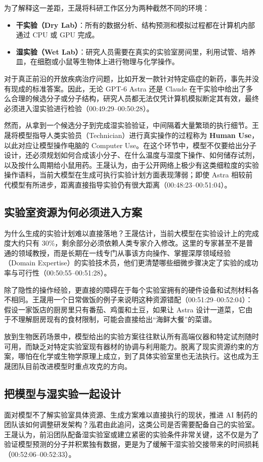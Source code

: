 \documentclass[UTF8,a4paper,11pt,fontset=fandol]{ctexart}
\begin{document}
为了解释这一差距，王晟将科研工作区分为两种截然不同的环境：
\begin{itemize}
\item \textbf{干实验（Dry Lab）}：所有的数据分析、结构预测和模拟过程都在计算机内部通过 CPU 或 GPU 完成。
\item \textbf{湿实验（Wet Lab）}：研究人员需要在真实的实验室房间里，利用试管、培养皿，在细胞或小鼠等生物体上进行物理与化学操作。
\end{itemize}
对于真正前沿的开放疾病治疗问题，比如开发一款针对特定癌症的新药，事先并没有现成的标准答案。因此，无论 GPT-6 Astra 还是 Claude 在干实验中给出了多么合理的候选分子或分子结构，研究人员都无法仅凭计算机模拟断定其有效，最终必须进入湿实验进行检验（00:49:29–00:50:28）。

然而，从拿到一个候选分子到完成湿实验验证，中间隔着大量繁琐的执行细节。王晟将模型指导人类实验员（Technician）进行真实操作的过程称为 \textbf{Human Use}，以此对应让模型操作电脑的 Computer Use。在这个环节中，模型不仅要给出分子设计，还必须规划如何合成该小分子、在什么温度与湿度下操作、如何储存试剂，以及按什么周期给小鼠用药。王晟认为，由于公开网络上极少有这类细粒度的实验操作语料，当前大模型在生成可执行实验计划方面表现薄弱；即使 Astra 相较前代模型有所进步，距离直接指导实验仍有很大距离（00:48:23–00:51:04）。

\subsection{实验室资源为何必须进入方案}
为什么生成的实验计划难以直接落地？王晟估计，当前大模型在实验设计上的完成度大约只有 30\%，剩余部分必须依赖人类专家介入修改。这里的专家甚至不是普通的领域教授，而是长期在一线专门从事该方向操作、掌握深厚领域经验（Domain Expertise）的实验技术员，他们更清楚哪些细微步骤决定了实验的成功率与可行性（00:50:55–00:51:28）。

除了隐性的操作经验，更直接的障碍在于每个实验室拥有的硬件设备和试剂材料各不相同。王晟用一个日常做饭的例子来说明这种资源错配（00:51:29–00:52:04）：假设一家饭店的厨房里只有番茄、鸡蛋和土豆，如果让 Astra 设计一道菜，它由于不理解厨房现有的食材限制，可能会直接给出“海鲜大餐”的菜谱。

放到生物医药场景中，模型给出的实验方案往往默认所有高端仪器和特定试剂随时可用，而缺乏对特定实验室现有器材的协调与利用能力。脱离了现实资源约束的方案，哪怕在化学或生物学原理上成立，到了具体实验室里也无法执行。这也成为王晟团队目前改进模型时重点攻克的方向。

\subsection{把模型与湿实验一起设计}
面对模型不了解实验室具体资源、生成方案难以直接执行的现状，推进 AI 制药的团队该如何调整研发架构？泓君由此追问，这类公司是否需要配备自己的实验室。王晟认为，前沿团队配备湿实验室或建立紧密的实验条件非常关键，这不仅是为了验证模型预测的分子并积累独有数据，更是为了缓解干湿实验交接带来的时间损耗（00:52:06–00:52:33）。
\end{document}
